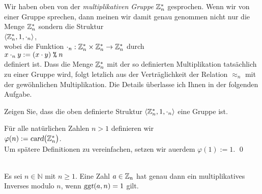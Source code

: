 \remark
Wir haben oben von der \emph{multiplikativen Gruppe} $\mathbb{Z}_{n}^*$ gesprochen.  Wenn wir von
einer Gruppe sprechen, dann meinen wir damit genau genommen nicht nur die Menge $\mathbb{Z}_{n}^*$
sondern die Struktur 
\\[0.2cm]
\hspace*{1.3cm}
$\langle \mathbb{Z}_{n}^*, 1, \cdot_n \rangle$,
\\[0.2cm]
wobei die Funktion $\cdot_n : \mathbb{Z}_{n}^* \times \mathbb{Z}_{n}^* \rightarrow \mathbb{Z}_{n}^*$ durch 
\\[0.2cm]
\hspace*{1.3cm}
$x \cdot_n y := (x \cdot y) \;\texttt{\%}\; n$
\\[0.2cm]
definiert ist.  Dass die Menge $\mathbb{Z}_{n}^*$ mit der so definierten Multiplikation tats\"{a}chlich
zu einer Gruppe wird, folgt letzlich aus der Vertr\"{a}glichkeit der Relation $\approx_n$ mit der
gew\"{o}hnlichen Multiplikation.  Die Details \"{u}berlasse ich Ihnen in der folgenden Aufgabe.

\exercise
Zeigen Sie, dass die oben definierte Struktur $\langle \mathbb{Z}_{n}^*, 1, \cdot_n \rangle$
eine Gruppe ist.


\begin{Definition} F\"{u}r alle nat\"{u}rlichen Zahlen $n > 1$ definieren wir
\\[0.2cm]
\hspace*{1.3cm}
$\varphi(n) := \textsl{card}\bigl(\mathbb{Z}_{n}^*\bigr)$.
\\[0.2cm]
Um sp\"{a}tere Definitionen zu vereinfachen,  setzen wir au\3erdem $\varphi(1) := 1$. \qed
\end{Definition}

\begin{Satz} 
  \label{satz:multiplikatives-inverses}
  \hspace*{\fill} \\
  Es sei $n \in \mathbb{N}$ mit $n \geq 1$.
  Eine Zahl $a \in \mathbb{Z}_{n}$ hat genau dann ein multiplikatives Inverses modulo $n$, wenn
  $\textsl{ggt}(a, n) = 1$ gilt.
\end{Satz}

